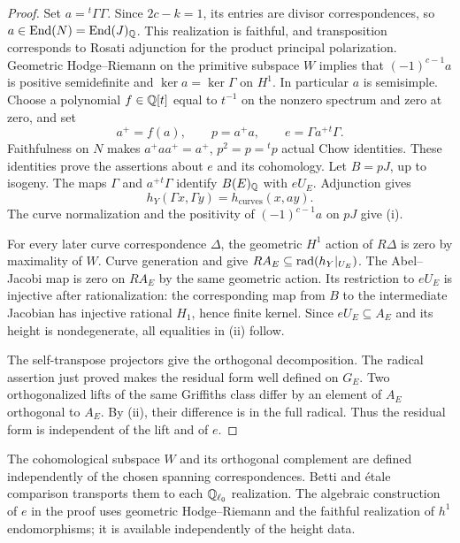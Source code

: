\begin{proof}
Set \(a={}^t\Gamma\Gamma\). Since \(2c-k=1\), its entries are
divisor correspondences, so \(a\in\operatorname{End}(N)=\operatorname{End}(J)_\mathbb Q\).
This realization is faithful, and transposition corresponds to
Rosati adjunction for the product principal polarization.
Geometric Hodge--Riemann on the primitive subspace \(W\) implies
that \((-1)^{c-1}a\) is positive semidefinite and
\(\ker a=\ker\Gamma\) on \(H^1\). In particular \(a\) is
semisimple. Choose a polynomial \(f\in\mathbb Q[t]\) equal to
\(t^{-1}\) on the nonzero spectrum and zero at zero, and set
\[
 a^+=f(a),\qquad p=a^+a,\qquad
 e=\Gamma a^+{}^t\Gamma.
\]
Faithfulness on \(N\) makes \(a^+aa^+=a^+\), \(p^2=p={}^tp\)
actual Chow identities. These identities prove the assertions about
\(e\) and its cohomology. Let \(B=pJ\), up to isogeny.
The maps \(\Gamma\) and \(a^+{}^t\Gamma\) identify
\(B(E)_\mathbb Q\) with \(eU_E\). Adjunction gives
\[
 h_Y(\Gamma x,\Gamma y)=h_{\mathrm{curves}}(x,ay).
\]
The curve normalization and the positivity of
\((-1)^{c-1}a\) on \(pJ\) give (i).

For every later curve correspondence \(\Delta\), the geometric
\(H^1\) action of \(R\Delta\) is zero by maximality of \(W\).
Curve generation and  give
\(RA_E\subseteq\operatorname{rad}(h_Y|_{U_E})\). The Abel--Jacobi map is zero
on \(RA_E\) by the same geometric action. Its restriction to
\(eU_E\) is injective after rationalization: the corresponding
map from \(B\) to the intermediate Jacobian has injective rational
\(H_1\), hence finite kernel. Since \(eU_E\subseteq A_E\) and
its height is nondegenerate, all equalities in (ii) follow.

The self-transpose projectors give the orthogonal decomposition.
The radical assertion just proved makes the residual form well
defined on \(G_E\). Two orthogonalized lifts of the same Griffiths
class differ by an element of \(A_E\) orthogonal to \(A_E\).
By (ii), their difference is in the full radical. Thus the residual
form is independent of the lift and of \(e\).
\end{proof}

The cohomological subspace \(W\) and its orthogonal complement are
defined independently of the chosen spanning correspondences. Betti
and étale comparison transports them to each \(\mathbb Q_{\ell_0}\)
realization. The algebraic construction of \(e\) in the proof uses
geometric Hodge--Riemann and the faithful realization of \(h^1\)
endomorphisms; it is available independently of the height data.


